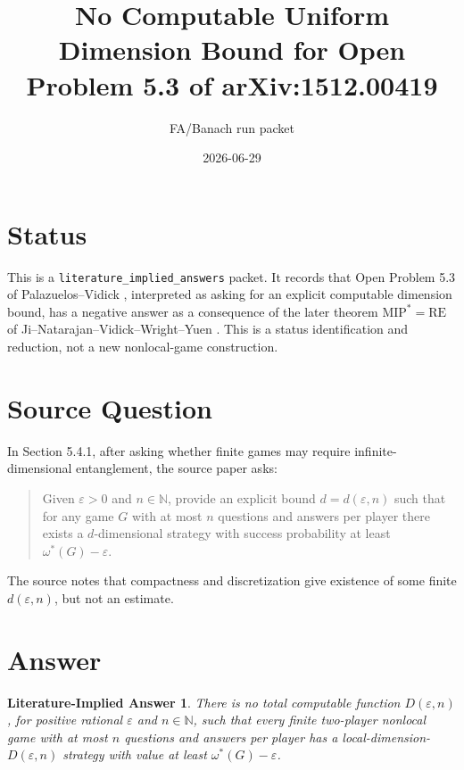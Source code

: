 \documentclass[11pt]{article}
\title{No Computable Uniform Dimension Bound for Open Problem 5.3 of arXiv:1512.00419}
\author{FA/Banach run packet}
\date{2026-06-29}
\newtheorem*{theorem}{Literature-Implied Answer}
\begin{document}
\maketitle

\section*{Status}

This is a \texttt{literature\_implied\_answers} packet.  It records that
Open Problem 5.3 of Palazuelos--Vidick \cite{PVSurvey}, interpreted as asking
for an explicit computable dimension bound, has a negative answer as a
consequence of the later theorem \( \mathrm{MIP}^{*}=\mathrm{RE} \) of
Ji--Natarajan--Vidick--Wright--Yuen \cite{MIPRE}.  This is a status
identification and reduction, not a new nonlocal-game construction.

\section*{Source Question}

In Section 5.4.1, after asking whether finite games may require
infinite-dimensional entanglement, the source paper asks:

\begin{quote}
Given \(\varepsilon>0\) and \(n\in\mathbb N\), provide an explicit bound
\(d=d(\varepsilon,n)\) such that for any game \(G\) with at most \(n\)
questions and answers per player there exists a \(d\)-dimensional strategy
with success probability at least \(\omega^*(G)-\varepsilon\).
\end{quote}

The source notes that compactness and discretization give existence of some
finite \(d(\varepsilon,n)\), but not an estimate.

\section*{Answer}

\begin{theorem}
There is no total computable function \(D(\varepsilon,n)\), for positive
rational \(\varepsilon\) and \(n\in\mathbb N\), such that every finite
two-player nonlocal game with at most \(n\) questions and answers per player
has a local-dimension-\(D(\varepsilon,n)\) strategy with value at least
\(\omega^*(G)-\varepsilon\).
\end{theorem}
\end{document}
